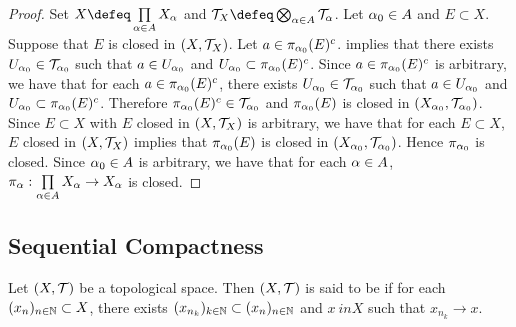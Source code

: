 \documentclass{book}
\begin{document}
 \begin{proof}
 	Set $X \defeq \prod\limits_{\al \in A} X_{\al}$ and $\MT_X \defeq \bigotimes_{\al \in A} \MT_{\al}$. Let $\alpha_0 \in A$ and $E \subset X$. Suppose that $E$ is closed in $(X, \mathcal{T}_X)$. Let $a \in \pi_{\alpha_0}(E)^c$.  implies that there exists $U_{\alpha_0} \in \mathcal{T}_{\alpha_0}$ such that $a \in U_{\alpha_0}$ and $U_{\alpha_0} \subset \pi_{\alpha_0}(E)^c$. Since $a \in \pi_{\alpha_0}(E)^c$ is arbitrary, we have that for each $a \in \pi_{\alpha_0}(E)^c$, there exists $U_{\alpha_0} \in \mathcal{T}_{\alpha_0}$ such that $a \in U_{\alpha_0}$ and $U_{\alpha_0} \subset \pi_{\alpha_0}(E)^c$. Therefore $\pi_{\alpha_0}(E)^c \in \mathcal{T}_{\alpha_0}$ and $\pi_{\alpha_0}(E)$ is closed in $(X_{\alpha_0}, \mathcal{T}_{\alpha_0})$. Since $E \subset X$ with $E$ closed in $(X, \mathcal{T}_X)$ is arbitrary, we have that for each $E \subset X$, $E$ closed in $(X, \mathcal{T}_X)$ implies that $\pi_{\alpha_0}(E)$ is closed in $(X_{\alpha_0}, \mathcal{T}_{\alpha_0})$. Hence $\pi_{\alpha_0}$ is closed. Since $\alpha_0 \in A$ is arbitrary, we have that for each $\alpha \in A$, $\pi_{\alpha} : \prod\limits_{\alpha \in A} X_{\alpha} \rightarrow X_{\alpha}$ is closed.
 \end{proof}
 
 
 
 
 
 
 
 
 
 
 
 
 
 
 
 
 
 
 
 
 
 
 
 
 
 
 
 
 
 
 
 
 
 
 
 
 
 
 
 
 
 \subsection{Sequential Compactness}
 
 \begin{defn}  
 	Let $(X, \mathcal{T})$ be a topological space. Then $(X, \mathcal{T})$ is said to be  if for each $(x_n)_{n \in \mathbb{N}} \subset X$, there exists $(x_{n_k})_{k \in \mathbb{N}} \subset (x_n)_{n \in \mathbb{N}}$ and $x \ in X$ such that $x_{n_k} \rightarrow x$.   
 \end{defn}
\end{document}
